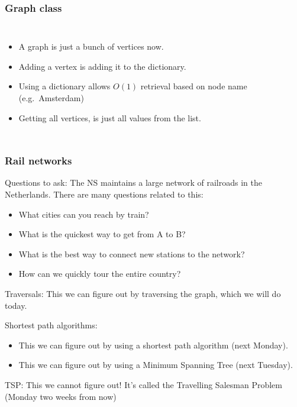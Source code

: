 \begin{frame}
	\frametitle{Graph class}
	
	\begin{columns}[T]
			
		\begin{itemize}
			
			\item A graph is just a bunch of vertices now.
				
			\item Adding a vertex is adding it to the dictionary.
			\item Using a dictionary allows $O(1)$ retrieval based on node name (e.g.\ Amsterdam)
				
			\item Getting all vertices, is just all values from the list.
		\end{itemize}
			
	\end{columns}
\end{frame}

\begin{frame}
	\frametitle{Rail networks}
	
Questions to ask:
				The NS maintains a large network of railroads in the Netherlands. There are many questions related to this:
				\begin{itemize}
					\item What cities can you reach by train?
						
					\item What is the quickest way to get from A to B?
						
					\item What is the best way to connect new stations to the network?
						
					\item How can we quickly tour the entire country?
				\end{itemize}
Traversals: 	This we can figure out by traversing the graph, which we will do today.

Shortest path algorithms:	

				\begin{itemize}
					\item This we can figure out by using a shortest path algorithm (next Monday).
					\item This we can figure out by using a Minimum Spanning Tree (next Tuesday).
			\end{itemize}
TSP: This we cannot figure out! It's called the Travelling Salesman Problem (Monday two weeks from now)
\end{frame}

